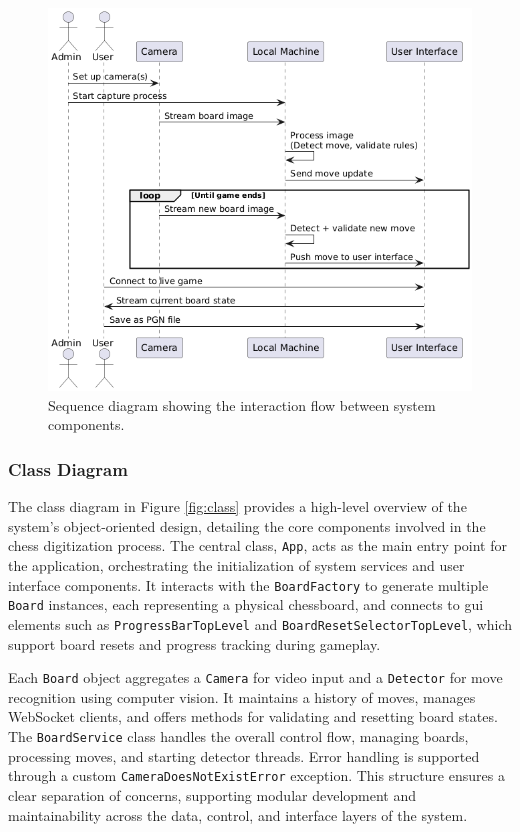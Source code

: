 \begin{figure}[h!]
    \centering
    \includegraphics[width=0.75\linewidth]{figures/results/uml/sequence.png}
    \caption[Sequence diagram]{Sequence diagram showing the interaction flow between system components.}
    \label{fig:sequence}
\end{figure}



\subsubsection*{Class Diagram}

The class diagram in Figure \ref{fig:class} provides a high-level overview of the system’s object-oriented design, detailing the core components involved in the chess digitization process. The central class, \texttt{App}, acts as the main entry point for the application, orchestrating the initialization of system services and user interface components. It interacts with the \texttt{BoardFactory} to generate multiple \texttt{Board} instances, each representing a physical chessboard, and connects to \gls{gui} elements such as \texttt{ProgressBarTopLevel} and \texttt{BoardResetSelectorTopLevel}, which support board resets and progress tracking during gameplay. \\

\newpage

Each \texttt{Board} object aggregates a \texttt{Camera} for video input and a \texttt{Detector} for move recognition using computer vision. It maintains a history of moves, manages WebSocket clients, and offers methods for validating and resetting board states. The \texttt{BoardService} class handles the overall control flow, managing boards, processing moves, and starting detector threads. Error handling is supported through a custom \texttt{CameraDoesNotExistError} exception. This structure ensures a clear separation of concerns, supporting modular development and maintainability across the data, control, and interface layers of the system.

